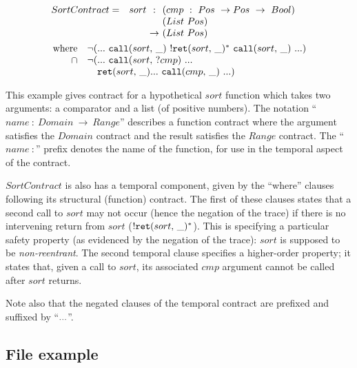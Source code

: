 \renewcommand*{\arraystretch}{1.2}
\newcommand*{\call}[1]{\scallev{#1}{\_}}
\newcommand*{\ret}[1]{\sretev{#1}{\_}}
\begin{align*}
 &\begin{array}{ l @{\quad}l@{\ } c @{\ }l }
 SortContract =
 &sort &:   &(cmp\ :\ Pos\ \to Pos\ \to\ Bool) \\
 &     &    &(List\ Pos) \\
 &     &\to &(List\ Pos) \\
 \end{array}
 \\
 &~\begin{array}{ @{~}r@{} l @{}l }
  \text{where}\quad
  &\stnot{(&\sddd~ \call{sort}~ \stmany{\snonevent{\ret{sort}}}~ \call{sort}~ \sddd)} \\
  \cap\quad
  &\stnot{(&\sddd~ \scallev{sort}{?cmp}~ \sddd~ \\
  &&\ret{sort} \sddd~ \call{cmp}~ \sddd)}
 \end{array}
\end{align*}

This example gives contract for a hypothetical $sort$ function which takes two arguments: a comparator and a list (of positive numbers).
%
The notation ``$\mathit{name}\ :\ Domain\ \to\ Range$'' describes a function contract where the argument satisfies the $Domain$ contract and the result satisfies the $Range$ contract.
%
The ``$\mathit{name}\ :$'' prefix denotes the name of the function, for use in the temporal aspect of the contract.

$SortContract$ is also has a temporal component, given by the ``where'' clauses following its structural (function) contract.
%
The first of these clauses states that a second call to $sort$ may not occur (hence the negation of the trace) if there is no intervening return from $sort$ ($\stmany{\snonevent{\ret{sort}}}$).
%
This is specifying a particular safety property (as evidenced by the negation of the trace): $sort$ is supposed to be \emph{non-reentrant}.
%
The second temporal clause specifies a higher-order property; it states that, given a call to $sort$, its associated $cmp$ argument cannot be called after $sort$ returns.

Note also that the negated clauses of the temporal contract are prefixed and suffixed by ``${\tt ...}$''.

\subsection{File example} \label{sec:file}

